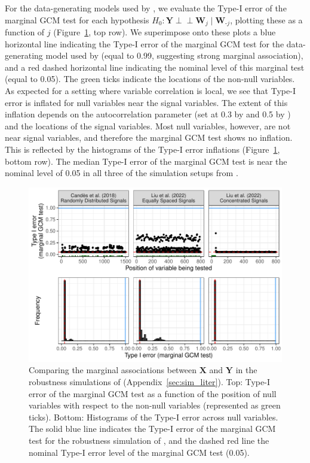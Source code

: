 \documentclass[12pt]{article}
\theoremstyle{definition}
\theoremstyle{remark}
\newcommand{\independent}{{\perp \! \! \! \perp}}		%
\newcommand{\prx}{\bm X}								%
\newcommand{\pry}{{\bm Y}}								%
\begin{document}
	For the data-generating models used by \citet{CetL16, Liu2022a}, we evaluate the Type-I error of the marginal GCM test for each hypothesis $H_0: \pry \independent \bm W_j \mid \bm W_{\text{-}j}$, plotting these as a function of $j$ (Figure~\ref{fig:evaluation_typeI_err}, top row). We superimpose onto these plots a blue horizontal line indicating the Type-I error of the marginal GCM test for the data-generating model used by \citet{Li2022} (equal to 0.99, suggesting strong marginal association), and a red dashed horizontal line indicating the nominal level of this marginal test (equal to 0.05). The green ticks indicate the locations of the non-null variables. As expected for a setting where variable correlation is local, we see that Type-I error is inflated for null variables near the signal variables. The extent of this inflation depends on the autocorrelation parameter (set at 0.3 by \cite{CetL16} and 0.5 by \cite{Liu2022a}) and the locations of the signal variables. Most null variables, however, are not near signal variables, and therefore the marginal GCM test shows no inflation. This is reflected by the histograms of the Type-I error inflations (Figure~\ref{fig:evaluation_typeI_err}, bottom row). The median Type-I error of the marginal GCM test is near the nominal level of 0.05 in all three of the simulation setups from \citet{CetL16, Liu2022a}.
	
	\begin{figure}[!ht]
		\centering
		\includegraphics{figures/type_I_Err_inflation_comparison.pdf}
		\caption{Comparing the marginal associations between $\prx$ and $\pry$ in the robustness simulations of \citet{CetL16, Liu2022a, Li2022} (Appendix~\ref{sec:sim_liter}). Top: Type-I error of the marginal GCM test as a function of the position of null variables with respect to the non-null variables (represented as green ticks). Bottom: Histograms of the Type-I error across null variables. The solid blue line indicates the Type-I error of the marginal GCM test for the robustness simulation of \citet{Li2022}, and the dashed red line the nominal Type-I error level of the marginal GCM test (0.05).}
		\label{fig:evaluation_typeI_err}
	\end{figure}
	
\end{document}
